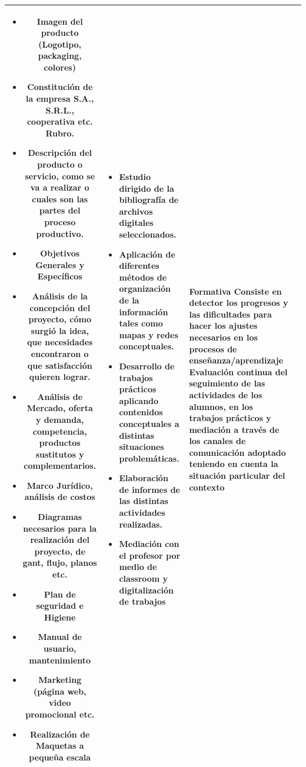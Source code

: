 \documentclass[../main]{subfiles}
\newcommand{\estrategias}{\begin{itemize}[leftmargin=0.3cm]\item Estudio dirigido de la bibliografía de archivos digitales seleccionados.\item Aplicación de diferentes métodos de organización de la información tales como mapas y redes conceptuales. \item Desarrollo de trabajos prácticos aplicando contenidos conceptuales a distintas situaciones problemáticas.\item Elaboración de informes de las distintas actividades realizadas.\item Mediación con el profesor por medio de classroom  y digitalización de trabajos\end{itemize}
}
\newcommand{\evaluacion}{\textbf{Formativa}  Consiste en detector los progresos y las dificultades para hacer los ajustes necesarios en los procesos de enseñanza/aprendizaje   Evaluación continua del seguimiento de las actividades de los alumnos, en los trabajos prácticos y mediación a través de los canales de comunicación adoptado teniendo en cuenta la situación particular del contexto}
\begin{document}
\begin{longtable}{|c|p{5.5cm}|p{5.5cm}|p{3cm}|}
\begin{itemize}[leftmargin=0.3cm]
        \item Imagen del producto (Logotipo, packaging,
colores)
\item Constitución de la empresa S.A., S.R.L.,
cooperativa etc. Rubro.
\item Descripción del producto o servicio, como se va
a realizar o cuales son las partes del proceso productivo.
\item Objetivos Generales y Específicos
\item Análisis de la concepción del proyecto, cómo
surgió la idea, que necesidades encontraron o
que satisfacción quieren lograr.
\item Análisis de Mercado, oferta y demanda,
competencia, productos sustitutos y
complementarios.
\item Marco Jurídico, análisis de costos
\item Diagramas necesarios para la realización del
proyecto, de gant, flujo, planos etc.
\item Plan de seguridad e Higiene
\item Manual de usuario, mantenimiento
\item Marketing (página web, video promocional etc.
\item Realización de Maquetas a pequeña escala
    
         \end{itemize}
         & \estrategias & \evaluacion\\ \hline
         
    \end{longtable}

\newpage
\end{document}
